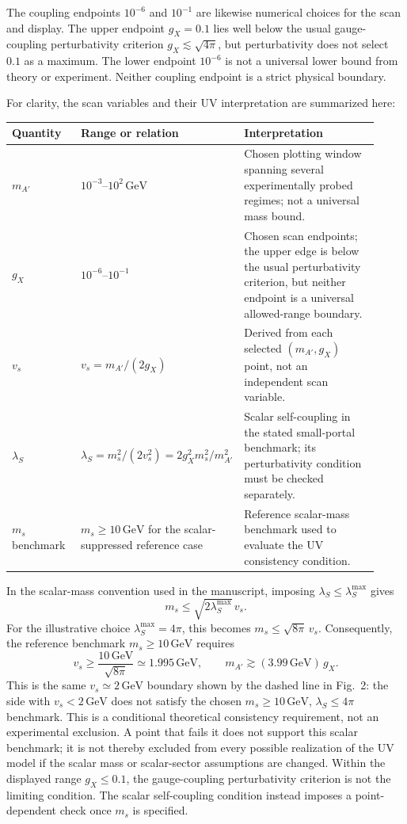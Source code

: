 \documentclass[12pt,a4paper]{article}
\begin{document}
The coupling endpoints \(10^{-6}\) and \(10^{-1}\) are likewise numerical choices for the scan and display. The upper endpoint \(g_X=0.1\) lies well below the usual gauge-coupling perturbativity criterion \(g_X\lesssim\sqrt{4\pi}\), but perturbativity does not select \(0.1\) as a maximum. The lower endpoint \(10^{-6}\) is not a universal lower bound from theory or experiment. Neither coupling endpoint is a strict physical boundary.

For clarity, the scan variables and their UV interpretation are summarized here:
\begin{center}
\small
\begin{tabular}{p{0.19\linewidth}p{0.34\linewidth}p{0.39\linewidth}}
\hline
Quantity & Range or relation & Interpretation\\
\hline
\(m_{A'}\) & \(10^{-3}\)--\(10^2\,\mathrm{GeV}\) & Chosen plotting window spanning several experimentally probed regimes; not a universal mass bound.\\
\(g_X\) & \(10^{-6}\)--\(10^{-1}\) & Chosen scan endpoints; the upper edge is below the usual perturbativity criterion, but neither endpoint is a universal allowed-range boundary.\\
\(v_s\) & \(v_s=m_{A'}/(2g_X)\) & Derived from each selected \((m_{A'},g_X)\) point, not an independent scan variable.\\
\(\lambda_S\) & \(\lambda_S=m_s^2/(2v_s^2)=2g_X^2m_s^2/m_{A'}^2\) & Scalar self-coupling in the stated small-portal benchmark; its perturbativity condition must be checked separately.\\
\(m_s\) benchmark & \(m_s\geq10\,\mathrm{GeV}\) for the scalar-suppressed reference case & Reference scalar-mass benchmark used to evaluate the UV consistency condition.\\
\hline
\end{tabular}
\end{center}

In the scalar-mass convention used in the manuscript, imposing \(\lambda_S\leq\lambda_S^{\max}\) gives
\[
m_s\leq\sqrt{2\lambda_S^{\max}}\,v_s.
\]
For the illustrative choice \(\lambda_S^{\max}=4\pi\), this becomes \(m_s\leq\sqrt{8\pi}\,v_s\). Consequently, the reference benchmark \(m_s\geq10\,\mathrm{GeV}\) requires
\[
v_s\geq\frac{10\,\mathrm{GeV}}{\sqrt{8\pi}}
\simeq1.995\,\mathrm{GeV},
\qquad
m_{A'}\gtrsim(3.99\,\mathrm{GeV})\,g_X.
\]
This is the same \(v_s\simeq2\,\mathrm{GeV}\) boundary shown by the dashed line in Fig.~2: the side with \(v_s<2\,\mathrm{GeV}\) does not satisfy the chosen \(m_s\geq10\,\mathrm{GeV}\), \(\lambda_S\leq4\pi\) benchmark. This is a conditional theoretical consistency requirement, not an experimental exclusion. A point that fails it does not support this scalar benchmark; it is not thereby excluded from every possible realization of the UV model if the scalar mass or scalar-sector assumptions are changed. Within the displayed range \(g_X\leq0.1\), the gauge-coupling perturbativity criterion is not the limiting condition. The scalar self-coupling condition instead imposes a point-dependent check once \(m_s\) is specified.
\end{document}
